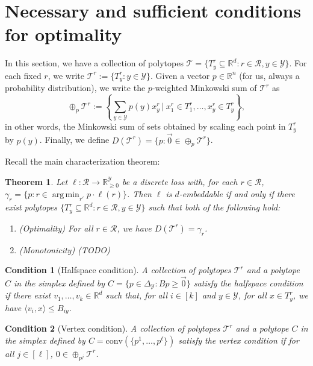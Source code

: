 \documentclass[12pt]{article}
\newcommand{\Opt}{\mathrm{Opt}}
\newcommand{\reals}{\mathbb{R}}
\newcommand{\simplex}{\Delta_\Y}
\newcommand{\R}{\mathcal{R}}
\newcommand{\T}{\mathcal{T}}
\newcommand{\Y}{\mathcal{Y}}
\newcommand{\inprod}[2]{\langle #1, #2 \rangle}%
\newcommand{\conv}{\mathrm{conv}}
\DeclareMathOperator*{\argmin}{arg\,min}
\newtheorem{theorem}{Theorem}
\newtheorem{definition}{Definition}
\newtheorem{condition}{Condition}
\begin{document}
  \section{Necessary and sufficient conditions for optimality}
  In this section, we have a collection of polytopes $\T = \{T^r_y \subseteq \reals^d : r \in \R, y \in \Y\}$.
  For each fixed $r$, we write $\T^r := \{T^r_y : y \in \Y\}$.
  Given a vector $p \in \reals^n$ (for us, always a probability distribution), we write the $p$-weighted Minkowski sum of $\T^r$ as
    \[ \oplus_p \T^r := \left\{ \sum_{y \in \Y} p(y) x^r_y ~\Big|~ x^r_1 \in T^r_1, \dots, x^r_y \in T^r_y \right\} , \]
  in other words, the Minkowski sum of sets obtained by scaling each point in $T^r_y$ by $p(y)$.
  Finally, we define $D(\T^r) = \{ p : \vec{0} \in \oplus_p \T^r\}$.


  Recall the main characterization theorem:
  \begin{theorem}
    Let $\ell: \R \to \reals_{\geq 0}^{\Y}$ be a discrete loss with, for each $r \in \R$, $\gamma_r = \{p : r \in \argmin_{r'} p \cdot \ell(r)\}$.
    Then $\ell$ is $d$-embeddable if and only if there exist polytopes $\{T^r_y \subseteq \reals^d : r \in \R, y \in \Y\}$ such that both of the following hold:
    \begin{enumerate}
      \item (Optimality) For all $r \in \R$, we have $D(\T^r) = \gamma_r$. %
      \item (Monotonicity) (TODO)
    \end{enumerate}
  \end{theorem}

  \begin{condition}[Halfspace condition]\label{cond:H-condition}
  	A collection of polytopes $\T^r$ and a polytope $C$ in the simplex defined by $C = \{p \in \simplex : Bp \geq \vec 0\}$ \emph{satisfy the halfspace condition} if there exist $v_1, \ldots, v_k \in \reals^d$ such that, for all $i \in [k]$ and $y \in \Y$, for all $x \in T^r_y$, we have $\inprod{v_i}{x} \leq B_{iy}$.
  \end{condition}
  \begin{condition}[Vertex condition]\label{cond:V-condition}
  	A collection of polytopes $\T^r$ and a polytope $C$ in the simplex defined by $C = \conv(\{p^1, \ldots, p^\ell\})$ \emph{satisfy the vertex condition} if for all $j \in [\ell]$, $0 \in \oplus_{p^j} \T^r$. %
  \end{condition}
\end{document}
